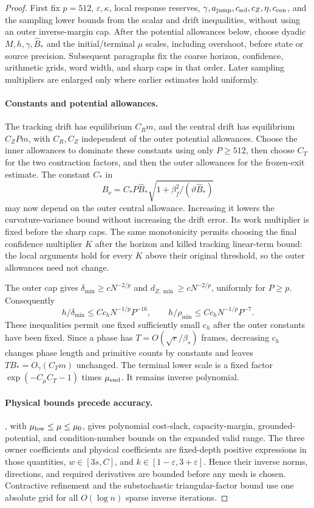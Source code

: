 \documentclass[11pt]{article}
\theoremstyle{remark}
\begin{document}
\begin{proof}
First fix $p=512$, $\varepsilon,\kappa$, local response reserves, $\gamma,a_{\rm
jump},c_{\rm sol},c_Z,\eta,c_{\rm cen}$, and the sampling lower bounds from the
scalar and drift inequalities, without using an outer inverse-margin cap.
After the potential allowances below, choose dyadic $M,h,\gamma,\widehat B_*$
and the initial/terminal $\mu$ scales, including overshoot, before state or
source precision.
Subsequent paragraphs fix the coarse horizon, confidence, arithmetic grids, word
width, and sharp caps in that order.
Later sampling multipliers are enlarged only where earlier estimates hold
uniformly.

\paragraph{Constants and potential allowances.}
The tracking drift has equilibrium $C_Rm$, and the central drift has equilibrium
$C_ZPm$, with $C_R,C_Z$ independent of the outer potential allowances.
Choose the inner allowances to dominate these constants using only $P\ge512$,
then choose $C_T$ for the two contraction factors, and then the outer allowances
for the frozen-exit estimate.
The constant $C_*$ in
\[
 B_\nu=C_*P\widehat B_*
        \sqrt{1+\beta_f^2/(\vartheta\widehat B_*)}
\]
may now depend on the outer central allowance.
Increasing it lowers the curvature-variance bound without increasing the drift
error.
Its work multiplier is fixed before the sharp caps.
The same monotonicity permits choosing the final confidence multiplier $K$ after
the horizon and killed tracking linear-term bound: the local arguments hold for
every $K$ above their original threshold, so the outer allowances need not
change.

The outer cap gives $\delta_{\min}\ge cN^{-2/p}$ and $d_{Z,\min}\ge cN^{-2/p}$,
uniformly for $P\ge p$.
Consequently
\[
 h/\delta_{\min}\le Cc_hN^{-1/p}P^{-16},\qquad
 h/\rho_{\min}\le Cc_hN^{-1/p}P^{-7}.
\]
These inequalities permit one fixed sufficiently small $c_h$ after the outer
constants have been fixed.
Since a phase has $T=O(\sqrt r/\beta_s)$ frames, decreasing $c_h$ changes phase
length and primitive counts by constants and leaves $TB_*=O_\gamma(C_Tm)$
unchanged.
The terminal lower scale is a fixed factor $\exp(-C_\mu C_T-1)$ times $\mu_{\rm
end}$.
It remains inverse polynomial.

\paragraph{Physical bounds precede accuracy.}
, with $\mu_{\rm low}\le\mu\le\mu_0$, gives
polynomial cost-slack, capacity-margin, grounded-potential, and condition-number
bounds on the expanded valid range.
The three owner coefficients and physical coefficients are fixed-depth positive
expressions in those quantities, $w\in[3s,C]$, and
$k\in[1-\varepsilon,3+\varepsilon]$.
Hence their inverse norms, directions, and required derivatives are bounded
before any mesh is chosen.
Contractive refinement and the substochastic triangular-factor bound use one
absolute grid for all $O(\log n)$ sparse inverse iterations.


\end{proof}
\end{document}
